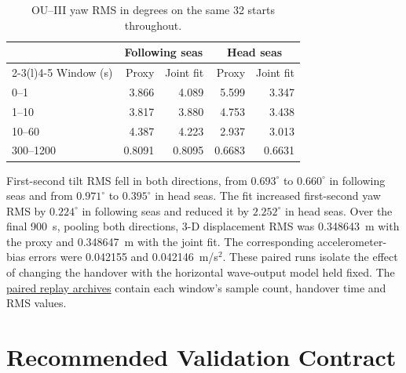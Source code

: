 \documentclass[conference]{IEEEtran}
\begin{document}
\begin{table}[t]
\centering\footnotesize
\caption{OU--III yaw RMS in degrees on the same 32 starts throughout.}
\label{tab:paired-live-yaw}
\begin{tabular}{@{}lrrrr@{}}
\toprule
 & \multicolumn{2}{c}{Following seas} & \multicolumn{2}{c}{Head seas} \\
\cmidrule(lr){2-3}\cmidrule(l){4-5}
Window (s) & Proxy & Joint fit & Proxy & Joint fit \\
\midrule
0--1      & 3.866 & 4.089 & 5.599 & 3.347 \\
1--10     & 3.817 & 3.880 & 4.753 & 3.438 \\
10--60    & 4.387 & 4.223 & 2.937 & 3.013 \\
300--1200 & 0.8091 & 0.8095 & 0.6683 & 0.6631 \\
\bottomrule
\end{tabular}
\end{table}

First-second tilt RMS fell in both directions, from $0.693^\circ$ to
$0.660^\circ$ in following seas and from $0.971^\circ$ to $0.395^\circ$
in head seas. The fit increased first-second
yaw RMS by $0.224^\circ$ in following seas and reduced it by
$2.252^\circ$ in head seas. Over the final 900~s, pooling both directions,
3-D displacement RMS was 0.348643~m with the proxy and 0.348647~m with
the joint fit. The corresponding accelerometer-bias errors were 0.042155
and 0.042146~m/s$^2$. These paired runs isolate the effect of changing the
handover with the horizontal wave-output model held fixed.
The \href{https://github.com/bareboat-necessities/ocean-imu/tree/a68243db48fdb5225305e34ea5c5dd64fe866eb5/reports/results/startup_learning/directional_qualification}{paired replay archives}
contain each window's sample count, handover time and RMS values.

\section{Recommended Validation Contract}
\label{sec:validation}
\end{document}

